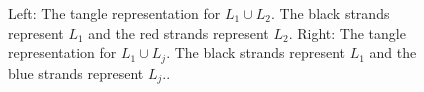 \documentclass[11pt]{amsart}
\begin{document}
%		
%		
%
%		
%		
%		

\begin{figure}[h]
\fontsize{9}{10}\selectfont
\centering
\def\svgwidth{0.325\textwidth}\qquad\qquad\qquad
\def\svgwidth{0.325\textwidth}
\caption{Left: The tangle representation for $L_1\cup L_2$. The black strands represent $L_1$ and the red strands represent $L_2$. Right: The tangle representation for $L_1\cup L_j$. The black strands represent $L_1$ and the blue strands represent $L_j$..}\label{fig:L1_L2}
\end{figure}



\end{document}

